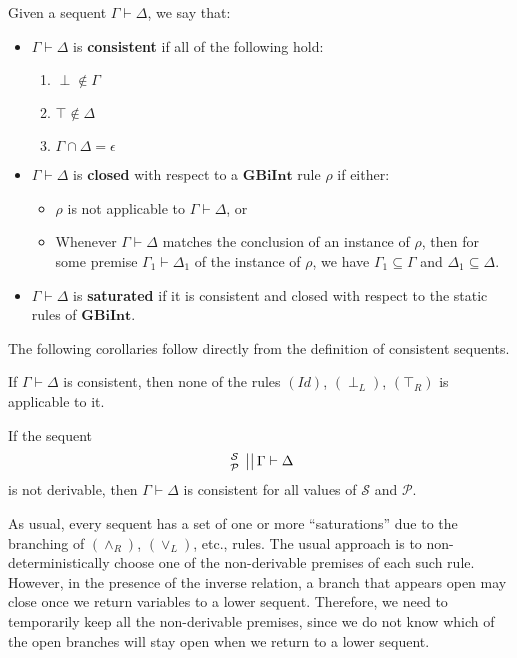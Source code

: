 \documentclass{llncs}
\numberwithin{equation}{section}
\newcommand{\Pred}{{\mathcal{P}}}
\newcommand{\Succ}{{\mathcal{S}}}
\newcommand{\ExAnd}{\wedge}
\newcommand{\ExOr}{\vee}
\newcommand{\sequent}{\vdash}
\newcommand{\Bottom}{\perp}
\newcommand{\Top}{\top}
\newcommand{\stacked}[2]{
\genfrac{}{}{0pt}{}{#1}{#2} 
 }
\newcommand{\Sequent}[4]{
        \left. \left. \begin{array}{l} \hspace{-5pt} \stacked{#1}{#2}  \hspace{-5pt}\end{array} \ \right|\right| #3 \sequent #4
}
\newcommand{\SequentAny}{
        \Sequent{\Succ}{\Pred}{\Gamma}{\Delta}
}
\newcommand{\GBiInt}{\mathbf{GBiInt}}
\newcommand{\IdRule}{(Id)}
\newcommand{\FalseLeftRule}{(\Bottom_L)}
\newcommand{\TrueRightRule}{(\Top_R)}
\newcommand{\AndRightRule}{(\ExAnd_R)}
\newcommand{\OrLeftRule}{(\ExOr_L)}
\begin{document}
\begin{definition}
Given a sequent $\Gamma \sequent \Delta$, we say that:
	\begin{itemize}
		\item $\Gamma \sequent \Delta$ is \textbf{consistent} if all of the following hold:
			\begin{enumerate}
				\item $\Bottom \not\in \Gamma$
				\item $\Top \not\in \Delta$
				\item $\Gamma \cap \Delta = \epsilon$				
			\end{enumerate}
		\item $\Gamma \sequent \Delta$ is \textbf{closed} with respect to a $\GBiInt$ rule $\rho$ if either:
			\begin{itemize}
				\item $\rho$ is not applicable to $\Gamma \sequent \Delta$, or
				\item Whenever $\Gamma \sequent \Delta$ matches the conclusion of an instance of $\rho$, then for some premise $\Gamma_1 \sequent \Delta_1$ of the instance of $\rho$, we have $\Gamma_1 \subseteq \Gamma$ and $\Delta_1 \subseteq \Delta$.
			\end{itemize}
		\item $\Gamma \sequent \Delta$ is \textbf{saturated} if it is consistent and closed with respect to the static rules of $\GBiInt$.
	\end{itemize}
\end{definition}

The following corollaries follow directly from the definition of consistent sequents.

\begin{corollary}\label{consNonId}
If $\Gamma \sequent \Delta$ is consistent, then none of the rules $\IdRule$, $\FalseLeftRule$, $\TrueRightRule$ is applicable to it.
\end{corollary}

\begin{corollary}\label{nonderIsConsistent}
If the sequent $$\SequentAny$$ is not derivable, then $\Gamma \sequent \Delta$ is consistent for all values of $\Succ$ and $\Pred$.
\end{corollary}

\begin{remark}\label{keepChoices}
  As usual, every sequent
  has a set of one or more ``saturations'' due to the branching of
  $\AndRightRule$, $\OrLeftRule$, etc., rules. The usual approach is
  to non-deterministically choose one of the non-derivable premises of
  each such rule. However, in the presence of the inverse relation, a
  branch that appears open may close once we return variables to a
  lower sequent. Therefore, we need to temporarily keep all the
  non-derivable premises, since we do not know which of the open
  branches will stay open when we return to a lower sequent.
\end{remark}
\end{document}
